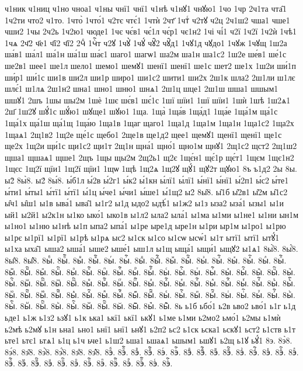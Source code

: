 {ч1ник
ч1ниц
ч1но
чноа1
ч1ны
чнї1
чнї1
ч1нѣ
ч1нꙋ1
чнꙋю1
1чо
1чр
2ч1та
чта̑1
1ч2ти
что2
ч1то.
1что̀
1что́1
ч2тє
чтє́1
1чтѝ
2чт҃
1чтⷭ
ч2тꙋ
ч2ц
2ч1ш2
чша1
чше1
чши2
1чы
2ч2ь
1ч2ю1
чюде1
1чє
чє́в1
чє́1л
чє́р1
чє1н2
1чі
чі́1
ч2ї
1ч2ї
1ч2ѝ
1чѣ1
1чѧ
2ч҃2
ч҃е1
ч҃ї2
ч҃ї2
2чⷣ
1чⷭ҇т
ч2ꙋ
1чꙋ̀
1чꙋ́
чꙋ̑2
чꙋ̑д1
1чꙋ1д
чꙋдо1
1чꙋж
1чꙋщ
1ш2а
ша́в1
ша́л1
ша́1н
ша́1ш
ша́є1
шаго1
шагѡ1
ша2м
ша1н
ша1с2
1ш2е
ше́в1
ше́1с
ше2в1
шее1
ше1л
шело1
шемо1
шемꙋ1
шенї1
шенї1
ше1с
шет2
ше1х
1ш2и
ши́1п
ши́р1
ши́1с
ши1в
ши2л
ши1р
широ1
ши1с2
шити1
ши2х
2ш1к
шла2
2ш1ли
ш1лє
шлє́1
ш1лѧ
2ш1н2
шна1
шно1
шню1
шнѧ1
2ш1ц
шце1
2ш1ш
шша1
шшым1
шшꙋ1
2шъ
1шы
шы2м
1шѐ
1шє
шє́в1
шє́1с
1шї
шїи1
1шї
шїи1
1шѝ
1шѣ
1ш2ѧ1
2ш҃
1ш2ꙋ
шꙋ́1с
шꙋ́ю1
шꙋще1
шꙋю1
1ща.
1ща̀
1ща́в
1ща́д1
1ща́е
1ща́1м
ща́1с
1ща́1х
ща́1ш
ща́1щ
1ща́ю
1ща1в
1щаг
щаго1
1ща1д
1ща1м
1ща1н
1ща1с2
1ща2х
1щаѧ1
2щ1в2
1щ2е
ще́1с
щебо1
2ще1в
ще1д2
щее1
щемꙋ1
щенї1
щенї1
ще1с
ще2х
1щ2и
щи́1с
щи1с2
щи1т
2щ1н
щна́1
щно́1
щно1м
щнꙋ1
2щ1с2
щст2
2щ1ш2
щша1
щшаѧ1
щше1
2щъ
1щы
щы2м
2щ2ь1
щ2є
1щє́н1
щє́1р
щє́т1
1щєм
1щє1н2
1щєс
1щ2ї
щїи1
1щ2ї
щїи1
1щѡ
1щѣ
1щ2ѧ
1щ2ꙋ
щꙋ́1
щꙋ2т
щꙋю1
8ъ
ъ1д2
2ы
8ы.
ы2̀
8ы̀8.
ы2́
8ы́8.
ы́б1л
ы́2в
ы́2г1
ы́к2
ы́1кн
ы́лї1
ы́лї1
ы́нї1
ы́нї1
ы́2п1
ы́с2
ы́те1
ы́ти1
ы́ты1
ы́тї1
ы́тї1
ы́1ц
ы́че1
ы́чи1
ы́ше1
ы́1щ2
ы2̑
8ы̑8.
ы̑1б
ы̑2в1
ы̑2м
ы̑1с2
ы̑ч1
ы̑ш1
ы1в
ыва́1
ыва̑1
ы1г2
ы1д
ыдо2
ыдѣ́1
ы1ж2
ы1з
ыза2
ыза́1
ызы1
ы1и
ый1
ы2й1
ы2к1н
ы1ко
ыко́1
ыко1в
ы1л2
ыла2
ыла́1
ы1ма
ы1ми
ы1не1
ы1ни
ын1м
ы1но1
ы1ню
ы1нѣ
ы1п
ыпа2
ыпа́1
ы1ре
ыре1д
ыре1н
ы1ри
ыр1м
ы1ро1
ы1рю
ы1рє
ы1рї1
ы1рї1
ы1рѣ
ы1рѧ
ыс2
ы1ск
ы1со
ы1сѡ
ысѡ́1
ы1т
ытї1
ытї1
ытꙋ́1
ы1ха
ыха̑1
ыша2
ыша́1
ыше2
ыше́1
ыш1л
ы1щ
ыща́1
ыщи́1
ыщꙋ2
ы1ѧ1
8ы҆̀8.
8ы҆́8.
8ы҆̈8.
8ы҆̑8.
8ыⷠ.
8ыⷠ҇.
8ыⷡ.
8ыⷡ҇.
8ыⷢ.
8ыⷢ҇.
8ыⷣ.
8ыⷣ҇.
8ыⷤ.
8ыⷤ҇.
8ыⷥ.
8ыⷥ҇.
8ыⷦ.
8ыⷦ҇.
8ыⷧ.
8ыⷧ҇.
8ыⷨ.
8ыⷨ҇.
8ыⷩ.
8ыⷩ҇.
8ыⷪ.
8ыⷪ҇.
8ыⷫ.
8ыⷫ҇.
8ыⷬ.
8ыⷬ҇.
8ыⷭ.
8ыⷭ҇.
8ыⷮ.
8ыⷮ҇.
8ыⷯ.
8ыⷯ҇.
8ыⷰ.
8ыⷰ҇.
8ыⷱ.
8ыⷱ҇.
8ыⷲ.
8ыⷲ҇.
8ыⷳ.
8ыⷳ҇.
8ыⷴ.
8ыⷴ҇.
8ыⷵ.
8ыⷵ҇.
8ыⷶ.
8ыⷶ҇.
8ыⷷ.
8ыⷷ҇.
8ыⷸ.
8ыⷸ҇.
8ыⷹ.
8ыⷹ҇.
8ыⷺ.
8ыⷺ҇.
8ыⷻ.
8ыⷻ҇.
8ыⷼ.
8ыⷼ҇.
8ыⷽ.
8ыⷽ҇.
8ыⷾ.
8ыⷾ҇.
8ыⷿ.
8ыⷿ҇.
8ыꙴ.
8ыꙴ҇.
8ыꙵ.
8ыꙵ҇.
8ыꙶ.
8ыꙶ҇.
8ыꙷ.
8ыꙷ҇.
8ыꙸ.
8ыꙸ҇.
8ыꙹ.
8ыꙹ҇.
8ыꙺ.
8ыꙺ҇.
8ыꙻ.
8ыꙻ҇.
8ы꙼.
8ы꙼҇.
8ы꙽.
8ы꙽҇.
8ь
ь1б
ьбо́1
ь2в
ьво2
ьво́1
ь1г
ь1д
ьде1
ь1ж
ь1з2
ьзꙋ1
ь1к
ька1
ькї1
ькї1
ькꙋ1
ь1ме
ь1ми
ь2мо2
ьмо́1
ь2мы
ь1мѝ
ь2мѣ
ь2мꙋ
ь1н
ьна1
ьно1
ьнї1
ьнї1
ьнꙋ1
ь2п2
ьс2
ь1ск
ьска1
ьскꙋ1
ьст2
ь1ств
ь1т
ьте1
ьтє1
ьтѧ1
ь1ц
ь1ч
ьче1
ь1ш2
ьша1
ьшаѧ1
ьшым1
ьшꙋ1
ь2щ
ь1ꙋ
ьꙋ́1
8э.
8э̀8.
8э́8.
8э̑8.
8э҆̀8.
8э҆́8.
8э҆̈8.
8э҆̑8.
8эⷠ.
8эⷠ҇.
8эⷡ.
8эⷡ҇.
8эⷢ.
8эⷢ҇.
8эⷣ.
8эⷣ҇.
8эⷤ.
8эⷤ҇.
8эⷥ.
8эⷥ҇.
8эⷦ.
8эⷦ҇.
8эⷧ.
8эⷧ҇.
8эⷨ.
8эⷨ҇.
8эⷩ.
8эⷩ҇.
8эⷪ.
8эⷪ҇.
8эⷫ.
8эⷫ҇.
8эⷬ.
8эⷬ҇.
8эⷭ.
8эⷭ҇.
}
